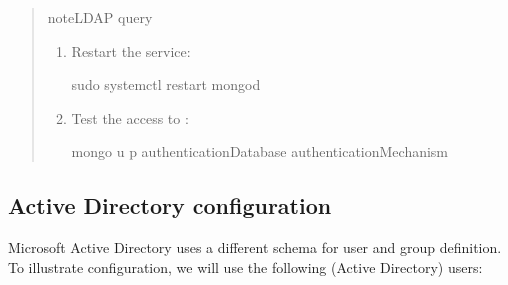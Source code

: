 \documentclass[letterpaper,10pt,english]{sphinxmanual}
\begin{document}
\begin{quote}
\begin{sphinxadmonition}{note}{LDAP query}
\begin{enumerate}
\begin{sphinxVerbatim}[commandchars=\\\{\}]
\end{sphinxVerbatim}

\sphinxAtStartPar
The \{USER\} variable substitutes the username transformed during the userToDNMapping stage.

\sphinxAtStartPar
Modify the given example configuration to match your deployment, For example, replace  with the hostname of your LDAP server. Replace the domain controllers (DC)  and  with those relevant to your organization. Depending on your LDAP schema, further modifications of the LDAP query may be required.

\item {} 
\sphinxAtStartPar
Restart the  service:

\begin{sphinxVerbatim}[commandchars=\\\{\}]
\PYGZdl{} sudo systemctl restart mongod
\end{sphinxVerbatim}

\item {} 
\sphinxAtStartPar
Test the access to :

\begin{sphinxVerbatim}[commandchars=\\\{\}]
mongo \PYGZhy{}u  \PYGZhy{}p  \PYGZhy{}\PYGZhy{}authenticationDatabase  \PYGZhy{}\PYGZhy{}authenticationMechanism 
\end{sphinxVerbatim}

\end{enumerate}
\end{sphinxadmonition}
\end{quote}


\subsection{Active Directory configuration}
\label{\detokenize{ldap-setup:active-directory-configuration}}\label{\detokenize{ldap-setup:active-directory}}
\sphinxAtStartPar
Microsoft Active Directory uses a different schema for user and group definition. To illustrate  configuration, we will use the following  (Active Directory) users:
\end{document}

